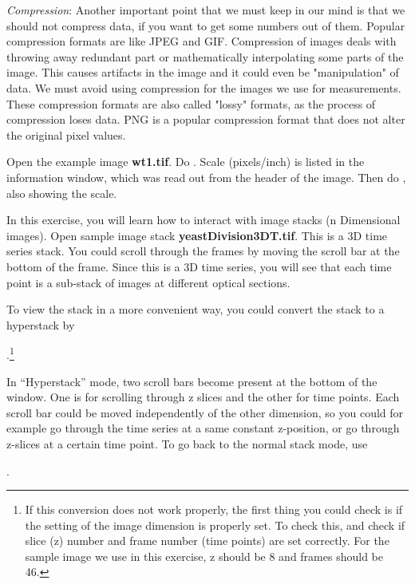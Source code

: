 \textit{Compression}: Another important point that we must keep in our mind is
that we should not compress data, if you want to get some numbers out of them.
Popular compression formats are like JPEG and GIF. Compression of images deals
with throwing away redundant part or mathematically interpolating some parts of
the image. This causes artifacts in the image and it could even be
"manipulation" of data. We must avoid using compression for the images we use
for measurements. These compression formats are also called "lossy" formats, as
the process of compression loses data. PNG is a popular compression format that does not
alter the original pixel values.

\begin{indentexercise}{1}
Open the example image \textbf{wt1.tif}. Do
. Scale (pixels/inch)
is listed in the information window, which was read out from the header
of the image. Then do ,
also showing the scale. 
\end{indentexercise}
\begin{indentexercise}{2}
  In this exercise, you will learn how to interact with image stacks (n
  Dimensional images).
  Open sample image stack \textbf{yeastDivision3DT.tif}.
  This is a 3D time series stack. You could scroll through the frames by moving
  the scroll bar at the bottom of the frame.
  Since this is a 3D time series, you will see that each time point is a
  sub-stack of images at different optical sections. 
  
  To view the stack in a more
  convenient way, you could convert the stack to a hyperstack by 
  
  .\footnote{If this conversion does not work properly, the first thing you could
  check is if the setting of the image dimension is properly set.
  To check this,  and check if slice (z)
  number and frame number (time points) are set correctly.
  For the sample image we use in this exercise, z should be 8 and frames should
  be 46.}
  
   In ``Hyperstack'' mode, two scroll bars become present at the bottom of the
   window. One is for scrolling through z slices and the other for time points.
   Each scroll bar could be moved independently of the other dimension, so you
   could for example go through the time series at a same constant z-position,
   or go through z-slices at a certain time point.
   To go back to the normal stack mode, use 
   
   .
\end{indentexercise}
